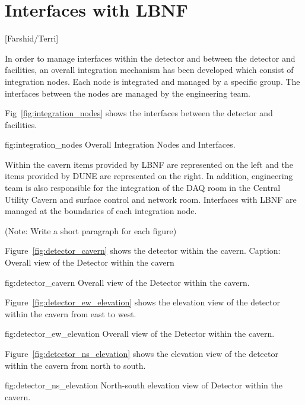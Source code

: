 \chapter{Interfaces with LBNF}
\label{vl:tc-lbnf}

[Farshid/Terri]

In order to manage interfaces within the detector and between the
detector and facilities, an overall integration mechanism has been
developed which consist of integration nodes. Each node is integrated
and managed by a specific group. The interfaces between the nodes are
managed by the  engineering team.


Fig~\ref{fig:integration_nodes}  shows the interfaces between the detector and facilities.
\begin{dunefigure}{fig:integration_nodes}
  {Overall Integration Nodes and Interfaces.}
\end{dunefigure}
Within the cavern items provided by LBNF are represented on the left
and the items provided by DUNE are represented on the right. In
addition,  engineering team is also responsible for the
integration of the DAQ room in the Central Utility Cavern and surface
control and network room. Interfaces with LBNF are managed at the
boundaries of each integration node.

(Note: Write a short paragraph for each figure)


Figure~\ref{fig:detector_cavern} shows the detector within the cavern.
Caption: Overall view of the Detector within the cavern
\begin{dunefigure}{fig:detector_cavern}
  {Overall view of the Detector within the cavern.}
\end{dunefigure}

Figure~\ref{fig:detector_ew_elevation} shows the elevation view of the
detector within the cavern from east to west.
\begin{dunefigure}{fig:detector_ew_elevation}
  {Overall view of the Detector within the cavern.}
\end{dunefigure}

Figure~\ref{fig:detector_ns_elevation} shows the elevation view of the
detector within the cavern from north to south.
\begin{dunefigure}{fig:detector_ns_elevation}
  {North-south elevation view of Detector within the cavern.}
\end{dunefigure}



